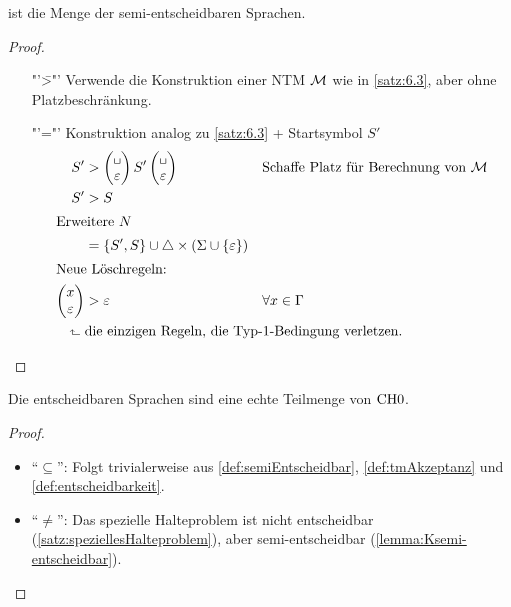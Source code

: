 {%

\begin{Satz}\label{satz:6.6}
 ist die Menge der semi-entscheidbaren Sprachen.
\end{Satz}
\begin{proof}
	\begin{itemize}
	\item["'\=>"'] Verwende die Konstruktion einer \ac{NTM} $\mathcal{M}$ wie in \autoref{satz:6.3}, aber ohne Platzbeschränkung.
	\item["'\<="'] Konstruktion analog zu \autoref{satz:6.3} + Startsymbol $S'$
	\begin{align*}
		S' &\-> \pmqty{\blank\\\Eps} S' \pmqty{\blank\\\Eps} &&\text{Schaffe Platz für Berechnung von }\M\\
		S' &\-> S\\
	\shortintertext{Erweitere $N$}
		&= \{S',S\}\cup\triangle\x(\Sigma\cup\{\Eps\})\\
	\shortintertext{Neue Löschregeln:}
		\pmqty{x\\ \Eps } &\-> \Eps &&\forall x\in\Gamma\\
		\rotatebox{90}{$\Rsh$}\ &\mathrlap{\text{die einzigen
                                          Regeln, die Typ-1-Bedingung verletzen.}} \tag*{\qedhere}
	\end{align*}
	\end{itemize}
\end{proof}

\begin{Satz}
 Die entscheidbaren Sprachen sind eine echte Teilmenge von $\text{CH{0}}$.
\end{Satz}
\begin{proof}~
 \begin{itemize}
  \item "`$\subseteq$"':
  Folgt trivialerweise aus \autoref{def:semiEntscheidbar}, \autoref{def:tmAkzeptanz} und \autoref{def:entscheidbarkeit}.
  
  \item "`$\neq$"':
  Das spezielle Halteproblem ist nicht entscheidbar (\autoref{satz:speziellesHalteproblem}),
  aber semi-entscheidbar (\autoref{lemma:Ksemi-entscheidbar}).
  \qedhere
 \end{itemize}
\end{proof}




}
